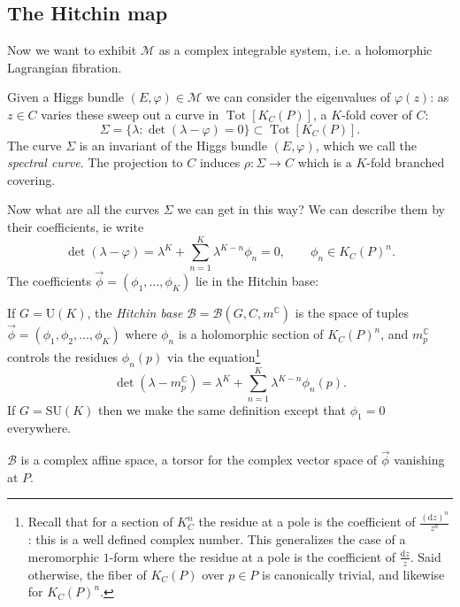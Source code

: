 \documentclass[12pt,letterpaper,reqno]{article}
\numberwithin{equation}{section}
\newcommand{\cB}{\ensuremath{\mathcal B}}
\newcommand{\cM}{\ensuremath{\mathcal M}}
\newcommand{\C}{\ensuremath{\mathbb C}}
\newcommand{\de}{\mathrm{d}}
\newcommand{\vphi}{{\vec\phi}}
\newcommand{\ti}[1]{\textit{#1}}
\DeclareMathOperator{\Tot}{Tot}
\newcommand{\SU}{\mathrm{SU}}
\newcommand{\U}{\mathrm{U}}
\newcommand{\insfig}[2]{

\medskip
\noindent
\begin{minipage}{\linewidth}

\makebox[\linewidth]{\texttt{[image: figures/\#1-crop.pdf]}}

\end{minipage}
\medskip

}
\begin{document}
\subsection{The Hitchin map}

Now we want to exhibit $\cM$ as a complex integrable system,
i.e. a holomorphic Lagrangian fibration.

Given a Higgs bundle $(E,\varphi) \in \cM$ we can consider
the eigenvalues of $\varphi(z)$: as $z \in C$ varies
these sweep out a curve in $\Tot[K_C(P)]$, a $K$-fold cover of $C$:
\begin{equation}
  \Sigma = \{ \lambda: \det(\lambda - \varphi) = 0\} \subset \Tot[K_C(P)].
\end{equation}
The curve $\Sigma$ is an invariant of the Higgs 
bundle $(E,\varphi)$, which we call
the \ti{spectral curve}. 
The projection to $C$ induces $\rho: \Sigma \to C$ which is a $K$-fold branched covering.
\insfig{higgs-metric-17}{0.8}
Now what are all the curves $\Sigma$
we can get in this way?
We can describe them by their coefficients, ie write
\begin{equation} \label{eq:spectral-coeffs}
  \det(\lambda - \varphi) = \lambda^K + \sum_{n=1}^K \lambda^{K-n} \phi_n = 0, \qquad \phi_n \in K_C(P)^n.
\end{equation}
The coefficients $\vphi = (\phi_1, \dots, \phi_K)$ lie in the Hitchin base:

\begin{defn}
If $G = \U(K)$,
the \ti{Hitchin base} $\cB = \cB(G,C,m^\C)$ is
the space of tuples $\vphi = (\phi_1, \phi_2, \dots, \phi_K)$
where $\phi_n$ is a holomorphic section of $K_C(P)^n$,
and $m_p^\C$ controls the residues $\phi_n(p)$ via the equation\footnote{Recall that for a section of $K_C^n$ the residue at a pole is the coefficient of $\frac{(\de z)^n}{z^n}$: this is a well
defined complex number. This generalizes the case of a meromorphic $1$-form
where the residue at a pole is the coefficient of $\frac{\de z}{z}$. Said otherwise, the fiber of
$K_C(P)$ over $p \in P$ is canonically trivial,
and likewise for $K_C(P)^n$.}
\begin{equation}
  \det (\lambda - m_p^\C) = \lambda^K + \sum_{n=1}^K \lambda^{K-n} \phi_n(p).
\end{equation}
If $G = \SU(K)$ then we make the same definition except that
$\phi_1 = 0$ everywhere.
\end{defn}

$\cB$ is a complex affine space, a torsor for the complex vector space
of $\vphi$ vanishing at $P$.
\end{document}
